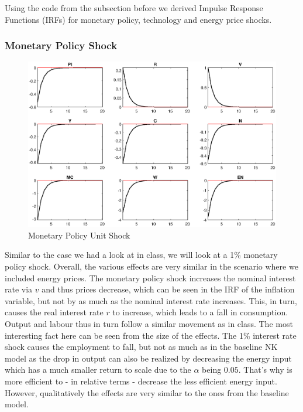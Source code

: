 \documentclass[a4paper,11pt]{article}
\begin{document}
Using the code from the subsection before we derived Impulse Response Functions (IRFs) for monetary policy, technology and energy price shocks.
\subsubsection{Monetary Policy Shock}
\begin{figure}[H]
\centering
\includegraphics[scale=0.7]{figures/monpolshock.eps}
\caption{Monetary Policy Unit Shock}
\end{figure}
Similar to the case we had a look at in class, we will look at a 1\% monetary policy shock. Overall, the various effects are very similar in the scenario where we included energy prices. The monetary policy shock increases the nominal interest rate via $v$ and thus prices decrease, which can be seen in the IRF of the inflation variable, but not by as much as the nominal interest rate increases. This, in turn, causes the real interest rate $r$ to increase, which leads to a fall in consumption. Output and labour thus in turn follow a similar movement as in class. The most interesting fact here can be seen from the size of the effects. The 1\% interest rate shock causes the employment to fall, but not as much as in the baseline NK model as the drop in output can also be realized by decreasing the energy input which has a much smaller return to scale due to the $\alpha$ being $0.05$. That's why is more efficient to - in relative terms - decrease the less efficient energy input. However, qualitatively the effects are very similar to the ones from the baseline model. 
\end{document}
